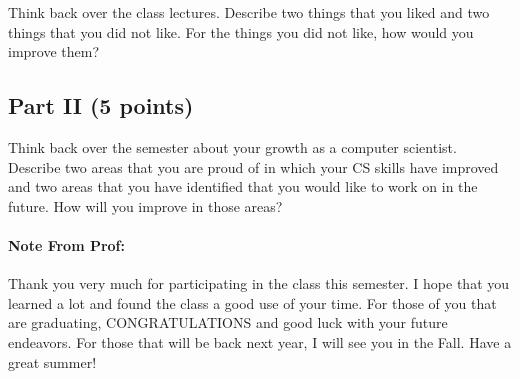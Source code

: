 \documentclass[11pt]{article}
\begin{document}
Think back over the class lectures.  Describe two things that you liked and two
things that you did not like.  For the things you did not like, how would you
improve them?

\shortAnswer

\subsection*{Part II (5 points)}

Think back over the semester about your growth as a computer scientist.
Describe two areas that you are proud of in which your CS skills have improved
and two areas that you have identified that you would like to work on in the
future.  How will you improve in those areas?

\shortAnswer

\paragraph{Note From Prof:} Thank you very much for participating in the class
this semester.  I hope that you learned a lot and found the class a good use of
your time.  For those of you that are graduating, CONGRATULATIONS and good luck
with your future endeavors.  For those that will be back next year, I will see
you in the Fall.  Have a great summer!
\end{document}
